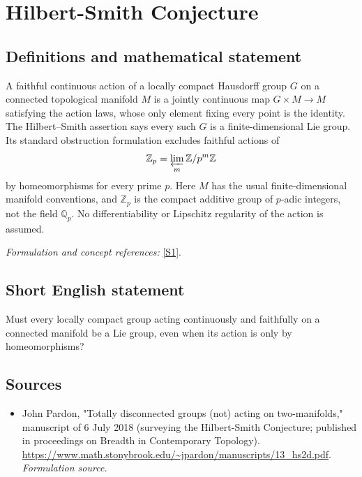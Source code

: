 \documentclass[11pt]{article}
\begin{document}
\section*{\texorpdfstring{Hilbert-Smith Conjecture}{Hilbert-Smith Conjecture}}\label{statement}
\subsection{Definitions and mathematical statement}
A faithful continuous action of a locally compact Hausdorff group $G$ on a connected topological manifold $M$ is a jointly continuous map $G\times M\to M$ satisfying the action laws, whose only element fixing every point is the identity. The Hilbert--Smith assertion says every such $G$ is a finite-dimensional Lie group. Its standard obstruction formulation excludes faithful actions of
\[
 {\mathbb{Z}}_p=\varprojlim_m{\mathbb{Z}}/p^m{\mathbb{Z}}
\]
by homeomorphisms for every prime $p$. Here $M$ has the usual finite-dimensional manifold conventions, and ${\mathbb{Z}}_p$ is the compact additive group of $p$-adic integers, not the field ${\mathbb{Q}}_p$. No differentiability or Lipschitz regularity of the action is assumed.
\par\smallskip\textit{Formulation and concept references:} \href{https://www.math.stonybrook.edu/~jpardon/manuscripts/13_hs2d.pdf}{[S1]}.

\subsection{Short English statement}
Must every locally compact group acting continuously and faithfully on a connected manifold be a Lie group, even when its action is only by homeomorphisms?
\subsection{Sources}
\begin{itemize}
\item[S1]John Pardon, "Totally disconnected groups (not) acting on two-manifolds," manuscript of 6 July 2018 (surveying the Hilbert-Smith Conjecture; published in proceedings on Breadth in Contemporary Topology).
\url{https://www.math.stonybrook.edu/~jpardon/manuscripts/13_hs2d.pdf}.
\textit{Formulation source.}
\end{itemize}
\end{document}
